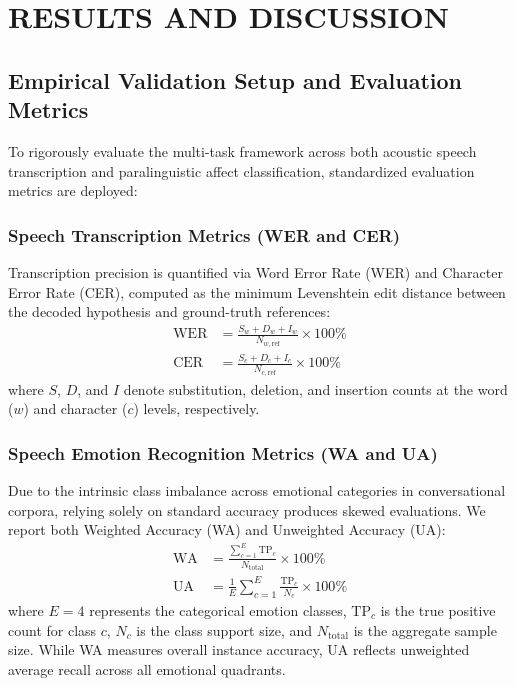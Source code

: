 \chapter{RESULTS AND DISCUSSION}
\label{ch:results}

\section{Empirical Validation Setup and Evaluation Metrics}
To rigorously evaluate the multi-task framework across both acoustic speech transcription and paralinguistic affect classification, standardized evaluation metrics are deployed:

\subsection{Speech Transcription Metrics (WER and CER)}
Transcription precision is quantified via Word Error Rate (WER) and Character Error Rate (CER), computed as the minimum Levenshtein edit distance between the decoded hypothesis and ground-truth references:
\begin{align}
    \text{WER} &= \frac{S_w + D_w + I_w}{N_{w, \text{ref}}} \times 100\% \\
    \text{CER} &= \frac{S_c + D_c + I_c}{N_{c, \text{ref}}} \times 100\%
\end{align}
where $S$, $D$, and $I$ denote substitution, deletion, and insertion counts at the word ($w$) and character ($c$) levels, respectively.

\subsection{Speech Emotion Recognition Metrics (WA and UA)}
Due to the intrinsic class imbalance across emotional categories in conversational corpora, relying solely on standard accuracy produces skewed evaluations. We report both Weighted Accuracy (WA) and Unweighted Accuracy (UA):
\begin{align}
    \text{WA} &= \frac{\sum_{c=1}^E \text{TP}_c}{N_{\text{total}}} \times 100\% \\
    \text{UA} &= \frac{1}{E} \sum_{c=1}^E \frac{\text{TP}_c}{N_c} \times 100\%
\end{align}
where $E = 4$ represents the categorical emotion classes, $\text{TP}_c$ is the true positive count for class $c$, $N_c$ is the class support size, and $N_{\text{total}}$ is the aggregate sample size. While WA measures overall instance accuracy, UA reflects unweighted average recall across all emotional quadrants.

